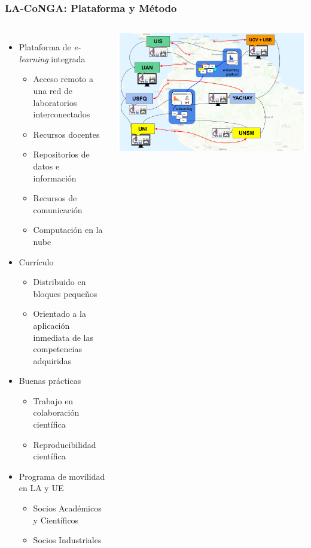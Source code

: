 \begin{frame}[fragile]
\frametitle{LA-CoNGA: Plataforma y Método}
\begin{columns}[c] %

\begin{itemize}\small
	\item Plataforma de {\it e-learning} integrada
	\begin{itemize}
		\item Acceso remoto a una red de laboratorios interconectados
		\item Recursos docentes
		\item Repositorios de datos e información
		\item Recursos de comunicación
		\item Computación en la nube
	\end{itemize}
	\item Currículo 
	\begin{itemize}
		\item Distribuido en bloques pequeños
		\item Orientado a la aplicación inmediata de las competencias adquiridas
	\end{itemize}
	\item Buenas prácticas
	\begin{itemize}
		\item Trabajo en colaboración científica
		\item Reproducibilidad científica
	\end{itemize}
	\item Programa de movilidad en LA y UE
	\begin{itemize}
		\item Socios Académicos y Científicos
		\item Socios Industriales
	\end{itemize}	
\end{itemize}
\begin{center}
\includegraphics[scale=0.16]{imagenes/labRemotosElearning.png}
\end{center}


\end{columns}
\end{frame}

